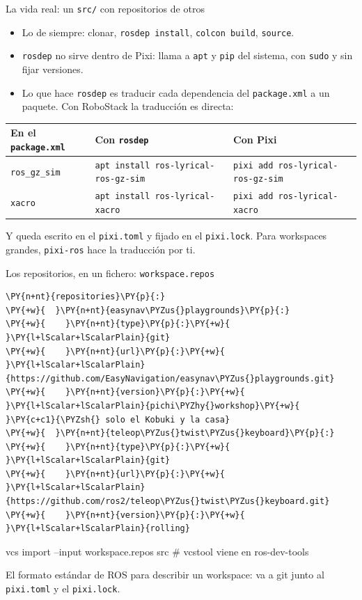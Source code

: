 \documentclass[aspectratio=169]{beamer}
\begin{document}
\begin{frame}{La vida real: un \texttt{src/} con repositorios de otros}
\begin{itemize}
    \item Lo de siempre: clonar, \lstinline|rosdep install|, \lstinline|colcon build|, \lstinline|source|.
    \item \texttt{rosdep} no sirve dentro de Pixi: llama a \texttt{apt} y \texttt{pip} del sistema, con \texttt{sudo} y sin fijar versiones.
    \item Lo que hace \texttt{rosdep} es traducir cada dependencia del \lstinline|package.xml| a un paquete. Con RoboStack la traducción es directa:
\end{itemize}
\vfill
\centering
\scriptsize
\begin{tabular}{lll}
\toprule
\textbf{En el \texttt{package.xml}} & \textbf{Con \texttt{rosdep}} & \textbf{Con Pixi} \\
\midrule
\texttt{ros\_gz\_sim} & \texttt{apt install ros-lyrical-ros-gz-sim} & \texttt{pixi add ros-lyrical-ros-gz-sim} \\
\texttt{xacro} & \texttt{apt install ros-lyrical-xacro} & \texttt{pixi add ros-lyrical-xacro} \\
\bottomrule
\end{tabular}
\vfill
\raggedright\small Y queda escrito en el \lstinline|pixi.toml| y fijado en el \lstinline|pixi.lock|. Para workspaces grandes, \texttt{pixi-ros} hace la traducción por ti.
\end{frame}

\begin{frame}[fragile]{Los repositorios, en un fichero: \texttt{workspace.repos}}
\begin{filelisting}
\begin{Verbatim}[commandchars=\\\{\},breaklines,breakanywhere]
\PY{n+nt}{repositories}\PY{p}{:}
\PY{+w}{  }\PY{n+nt}{easynav\PYZus{}playgrounds}\PY{p}{:}
\PY{+w}{    }\PY{n+nt}{type}\PY{p}{:}\PY{+w}{ }\PY{l+lScalar+lScalarPlain}{git}
\PY{+w}{    }\PY{n+nt}{url}\PY{p}{:}\PY{+w}{ }\PY{l+lScalar+lScalarPlain}{https://github.com/EasyNavigation/easynav\PYZus{}playgrounds.git}
\PY{+w}{    }\PY{n+nt}{version}\PY{p}{:}\PY{+w}{ }\PY{l+lScalar+lScalarPlain}{pichi\PYZhy{}workshop}\PY{+w}{      }\PY{c+c1}{\PYZsh{} solo el Kobuki y la casa}
\PY{+w}{  }\PY{n+nt}{teleop\PYZus{}twist\PYZus{}keyboard}\PY{p}{:}
\PY{+w}{    }\PY{n+nt}{type}\PY{p}{:}\PY{+w}{ }\PY{l+lScalar+lScalarPlain}{git}
\PY{+w}{    }\PY{n+nt}{url}\PY{p}{:}\PY{+w}{ }\PY{l+lScalar+lScalarPlain}{https://github.com/ros2/teleop\PYZus{}twist\PYZus{}keyboard.git}
\PY{+w}{    }\PY{n+nt}{version}\PY{p}{:}\PY{+w}{ }\PY{l+lScalar+lScalarPlain}{rolling}
\end{Verbatim}
\end{filelisting}
\begin{terminal}
vcs import --input workspace.repos src     # vcstool viene en ros-dev-tools
\end{terminal}
\vfill
\small El formato estándar de ROS para describir un workspace: va a git junto al \lstinline|pixi.toml| y el \lstinline|pixi.lock|.
\end{frame}
\end{document}
